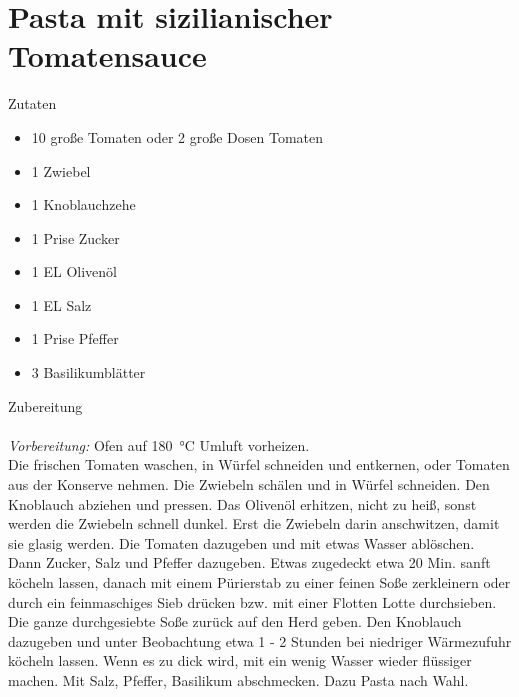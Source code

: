\section*{Pasta mit sizilianischer Tomatensauce}
\ihead{}\ohead{}
\cfoot{}
{\Large Zutaten}
\begin{multicols}{2}
\begin{itemize}
    \item \num{10} große Tomaten oder 2 große Dosen Tomaten
    \item \num{1} Zwiebel
    \item \num{1} Knoblauchzehe
    \item \num{1} Prise Zucker
    \item \num{1} EL Olivenöl
    \item \num{1} EL Salz
    \item \num{1} Prise Pfeffer
    \item \num{3} Basilikumblätter
\end{itemize}
\end{multicols}
\noindent
{\Large Zubereitung}\\
\\
\textit{Vorbereitung:} Ofen auf \SI{180}{\celsius} Umluft vorheizen.\\
Die frischen Tomaten waschen, in Würfel schneiden und entkernen, oder Tomaten aus der Konserve nehmen.
Die Zwiebeln schälen und in Würfel schneiden.
Den Knoblauch abziehen und pressen. 
Das Olivenöl erhitzen, nicht zu heiß, sonst werden die Zwiebeln schnell dunkel.
Erst die Zwiebeln darin anschwitzen, damit sie glasig werden.
Die Tomaten dazugeben und mit etwas Wasser ablöschen.
Dann Zucker, Salz und Pfeffer dazugeben.
Etwas zugedeckt etwa 20 Min. sanft köcheln lassen, danach mit einem Pürierstab zu einer feinen Soße zerkleinern oder durch ein feinmaschiges Sieb drücken bzw. mit einer Flotten Lotte durchsieben.
Die ganze durchgesiebte Soße zurück auf den Herd geben.
Den Knoblauch dazugeben und unter Beobachtung etwa 1 - 2 Stunden bei niedriger Wärmezufuhr köcheln lassen.
Wenn es zu dick wird, mit ein wenig Wasser wieder flüssiger machen.
Mit Salz, Pfeffer, Basilikum abschmecken.
Dazu Pasta nach Wahl.
